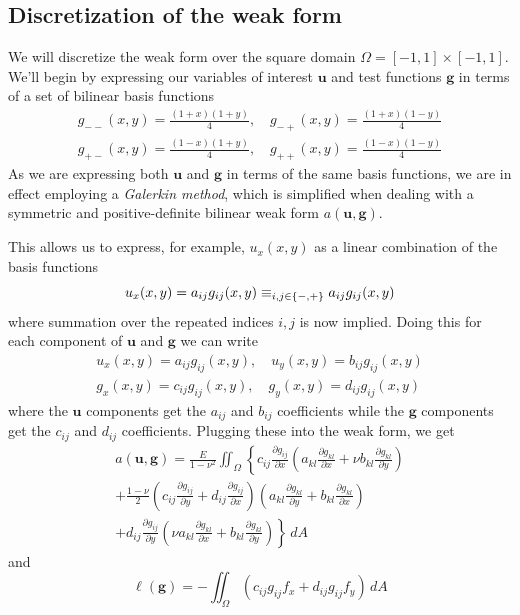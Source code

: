 \documentclass[11pt]{article}
\let\sumop\relax
\newcommand\p[2]{\frac{\partial #1}{\partial #2}}
\begin{document}
\subsection{Discretization of the weak form}
We will discretize the weak form over the square domain $\Omega = [-1,1]\times[-1,1]$. We'll begin by expressing our variables of interest $\bm{u}$ and test functions $\bm{g}$ in terms of a set of bilinear basis functions
\begin{equation}
\begin{gathered}
g_{--}(x,y) = \frac{(1+x)(1+y)}{4}, \quad g_{-+}(x,y) = \frac{(1+x)(1-y)}{4}\\
g_{+-}(x,y) = \frac{(1-x)(1+y)}{4}, \quad g_{++}(x,y) = \frac{(1-x)(1-y)}{4}
\end{gathered}
\end{equation}
As we are expressing both $\bm{u}$ and $\bm{g}$ in terms of the same basis functions, we are in effect employing a \emph{Galerkin method}, which is simplified when dealing with a symmetric and positive-definite bilinear weak form $a(\bm{u,g})$.

This allows us to express, for example, $u_x(x,y)$ as a linear combination of the basis functions
\begin{equation}
  u_x(x,y) = a_{ij}g_{ij}(x,y) \equiv \sumop_{i,j \in \{-,+\}} a_{ij}g_{ij}(x,y)
\end{equation}
where summation over the repeated indices $i,j$ is now implied. Doing this for each component of $\bm{u}$ and $\bm{g}$ we can write
\begin{equation}
\begin{gathered}
  u_x(x,y) = a_{ij}g_{ij}(x,y), \quad u_y(x,y) = b_{ij}g_{ij}(x,y) \\
  g_x(x,y) = c_{ij}g_{ij}(x,y), \quad g_y(x,y) = d_{ij}g_{ij}(x,y)
\end{gathered}
\end{equation}
where the $\bm{u}$ components get the $a_{ij}$ and $b_{ij}$ coefficients while the $\bm{g}$ components get the $c_{ij}$ and $d_{ij}$ coefficients. Plugging these into the weak form, we get
\begin{multline}
  a(\bm{u},\bm{g}) = \frac{E}{1-\nu^2} \iint_\Omega \left\{
    c_{ij}\p{g_{ij}}{x} \left(
      a_{kl}\p{g_{kl}}{x}
      + \nu b_{kl}\p{g_{kl}}{y}
    \right) \right. \\ \left.
  + \frac{1-\nu}{2} \left(
    c_{ij}\p{g_{ij}}{y}
    + d_{ij}\p{g_{ij}}{x}
  \right)
  \left(
    a_{kl}\p{g_{kl}}{y}
     + b_{kl}\p{g_{kl}}{x}
   \right) \right. \\ \left.
  + d_{ij}\p{g_{ij}}{y} \left(
    \nu a_{kl}\p{g_{kl}}{x}
    + b_{kl}\p{g_{kl}}{y}
  \right)
\right\} \, dA
\end{multline}
and
\begin{equation}
  \ell(\bm{g}) = -\iint_\Omega \left( c_{ij}g_{ij}f_x + d_{ij}g_{ij} f_y \right) \, dA
\end{equation}
\end{document}
